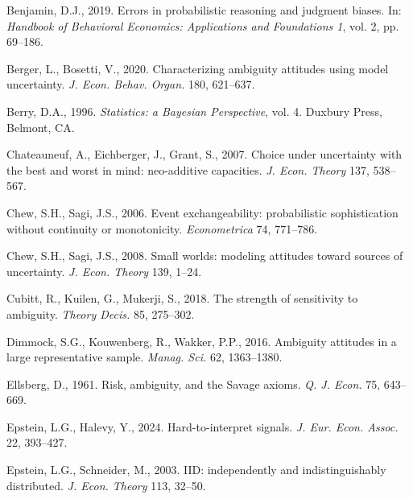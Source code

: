\documentclass[12pt,a4paper]{article}
\newenvironment{original}
  {\par\vspace{0.5em}\noindent\color{black}\ignorespaces}
  {\par\vspace{0.3em}}
\begin{document}
\begin{original}
\vspace{0.3em}
\noindent Benjamin, D.J., 2019. Errors in probabilistic reasoning and judgment biases. In: \textit{Handbook of Behavioral Economics: Applications and Foundations 1}, vol. 2, pp. 69--186.

\vspace{0.3em}
\noindent Berger, L., Bosetti, V., 2020. Characterizing ambiguity attitudes using model uncertainty. \textit{J. Econ. Behav. Organ.} 180, 621--637.

\vspace{0.3em}
\noindent Berry, D.A., 1996. \textit{Statistics: a Bayesian Perspective}, vol. 4. Duxbury Press, Belmont, CA.

\vspace{0.3em}
\noindent Chateauneuf, A., Eichberger, J., Grant, S., 2007. Choice under uncertainty with the best and worst in mind: neo-additive capacities. \textit{J. Econ. Theory} 137, 538--567.

\vspace{0.3em}
\noindent Chew, S.H., Sagi, J.S., 2006. Event exchangeability: probabilistic sophistication without continuity or monotonicity. \textit{Econometrica} 74, 771--786.

\vspace{0.3em}
\noindent Chew, S.H., Sagi, J.S., 2008. Small worlds: modeling attitudes toward sources of uncertainty. \textit{J. Econ. Theory} 139, 1--24.

\vspace{0.3em}
\noindent Cubitt, R., Kuilen, G., Mukerji, S., 2018. The strength of sensitivity to ambiguity. \textit{Theory Decis.} 85, 275--302.

\vspace{0.3em}
\noindent Dimmock, S.G., Kouwenberg, R., Wakker, P.P., 2016. Ambiguity attitudes in a large representative sample. \textit{Manag. Sci.} 62, 1363--1380.

\vspace{0.3em}
\noindent Ellsberg, D., 1961. Risk, ambiguity, and the Savage axioms. \textit{Q. J. Econ.} 75, 643--669.

\vspace{0.3em}
\noindent Epstein, L.G., Halevy, Y., 2024. Hard-to-interpret signals. \textit{J. Eur. Econ. Assoc.} 22, 393--427.

\vspace{0.3em}
\noindent Epstein, L.G., Schneider, M., 2003. IID: independently and indistinguishably distributed. \textit{J. Econ. Theory} 113, 32--50.


\end{original}
\end{document}

